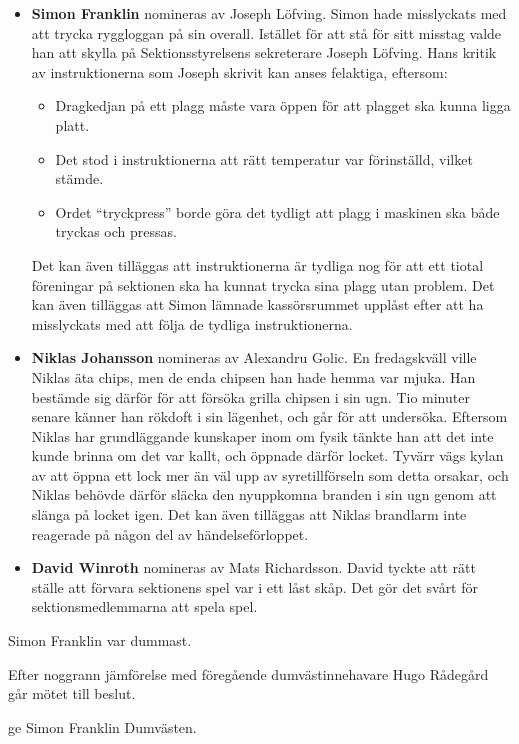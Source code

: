 \documentclass[hidelinks]{sektionsmote}
\begin{document}
\begin{itemize}
  \item \textbf{Simon Franklin} nomineras av Joseph Löfving.\newline
  Simon hade misslyckats med att trycka ryggloggan på sin overall.
  Istället för att stå för sitt misstag valde han att skylla på Sektionsstyrelsens sekreterare Joseph Löfving.
  Hans kritik av instruktionerna som Joseph skrivit kan anses felaktiga, eftersom:
  \begin{itemize}
    \item Dragkedjan på ett plagg måste vara öppen för att plagget ska kunna ligga platt.
    \item Det stod i instruktionerna att rätt temperatur var förinställd, vilket stämde.
    \item Ordet \enquote{tryckpress} borde göra det tydligt att plagg i maskinen ska både tryckas och pressas.
  \end{itemize}
  Det kan även tilläggas att instruktionerna är tydliga nog för att ett tiotal föreningar på sektionen ska ha kunnat trycka sina plagg utan problem.
  Det kan även tilläggas att Simon lämnade kassörsrummet upplåst efter att ha misslyckats med att följa de tydliga instruktionerna.

  \item \textbf{Niklas Johansson} nomineras av Alexandru Golic.\newline
  En fredagskväll ville Niklas äta chips, men de enda chipsen han hade hemma var mjuka.
  Han bestämde sig därför för att försöka grilla chipsen i sin ugn.
  Tio minuter senare känner han rökdoft i sin lägenhet, och går för att undersöka.
  Eftersom Niklas har grundläggande kunskaper inom om fysik tänkte han att det inte kunde brinna om det var kallt, och öppnade därför locket.
  Tyvärr vägs kylan av att öppna ett lock mer än väl upp av syretillförseln som detta orsakar, och Niklas behövde därför släcka den nyuppkomna branden i sin ugn genom att slänga på locket igen.
  Det kan även tilläggas att Niklas brandlarm inte reagerade på någon del av händelseförloppet.

  \item \textbf{David Winroth} nomineras av Mats Richardsson.\newline
  David tyckte att rätt ställe att förvara sektionens spel var i ett låst skåp.
  Det gör det svårt för sektionsmedlemmarna att spela spel.

\end{itemize}

\begin{beslut}
  \item Simon Franklin var dummast.
\end{beslut}
Efter noggrann jämförelse med föregående dumvästinnehavare Hugo Rådegård går mötet till beslut.
\begin{beslut}
  \item ge Simon Franklin Dumvästen.
\end{beslut}
\end{document}
